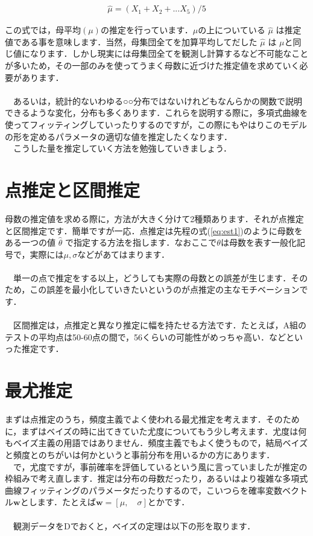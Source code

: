 \documentclass[11pt,a4paper,uplatex]{ujreport} 	%
\begin{document}
\begin{align}
\label{eq:est1}
\hat \mu = (X_1 + X_2 + ... X_5)/5
\end{align}

この式では，母平均$(\mu)$の推定を行っています．$\mu$の上についている $\hat \mu$ は推定値である事を意味します．当然，母集団全てを加算平均してだした $\hat \mu$ は $\mu$と同じ値になります．しかし現実には母集団全てを観測し計算するなど不可能なことが多いため，その一部のみを使ってうまく母数に近づけた推定値を求めていく必要があります．\\
\\
　あるいは，統計的ないわゆる○○分布ではないけれどもなんらかの関数で説明できるような変化，分布も多くあります．これらを説明する際に，多項式曲線を使ってフィッティングしていったりするのですが，この際にもやはりこのモデルの形を定めるパラメータの適切な値を推定したくなります．\\
　こうした量を推定していく方法を勉強していきましょう．\\

\section{点推定と区間推定}
母数の推定値を求める際に，方法が大きく分けて2種類あります．それが点推定と区間推定です．簡単ですが一応．点推定は先程の式(\ref{eq:est1})のように母数をある一つの値 $\hat \theta$ で指定する方法を指します．なおここで$\theta$は母数を表す一般化記号で，実際には$\mu, \sigma$などがあてはまります．\\
\\
　単一の点で推定をする以上，どうしても実際の母数との誤差が生じます．そのため，この誤差を最小化していきたいというのが点推定の主なモチベーションです．\\
\\
　区間推定は，点推定と異なり推定に幅を持たせる方法です．たとえば，A組のテストの平均点は50-60点の間で，56くらいの可能性がめっちゃ高い．などといった推定です．

\section{最尤推定}
まずは点推定のうち，頻度主義でよく使われる最尤推定を考えます．そのために，まずはベイズの時に出てきていた尤度についてもう少し考えます．尤度は何もベイズ主義の用語ではありません．頻度主義でもよく使うもので，結局ベイズと頻度とのちがいは何かというと事前分布を用いるかの方にあります．\\
　で，尤度ですが，事前確率を評価しているという風に言っていましたが推定の枠組みで考え直します．推定は分布の母数だったり，あるいはより複雑な多項式曲線フィッティングのパラメータだったりするので，こいつらを確率変数ベクトル$\mathbf{w}$とします．たとえば$\mathbf{w} = [\mu, \quad \sigma]$とかです．\\
\\
　観測データをDでおくと，ベイズの定理は以下の形を取ります．
\end{document}
